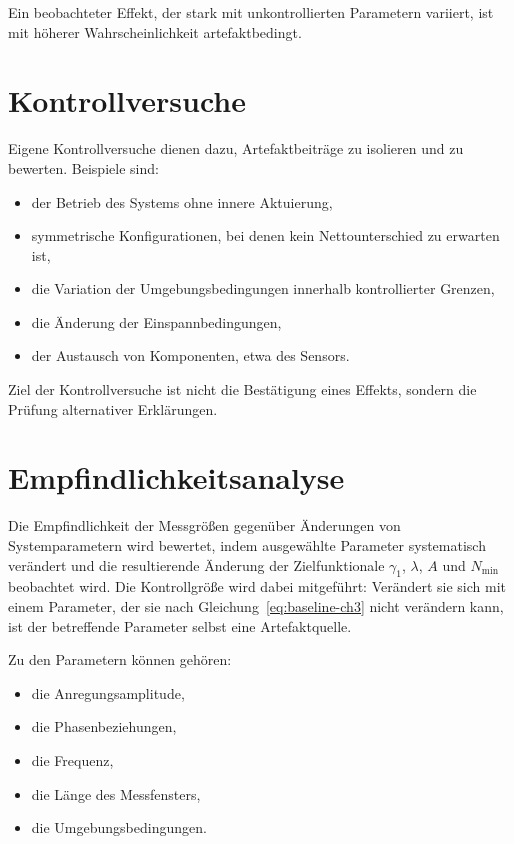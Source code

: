 \documentclass[12pt,a4paper]{report}
\begin{document}
Ein beobachteter Effekt, der stark mit unkontrollierten Parametern
variiert, ist mit höherer Wahrscheinlichkeit artefaktbedingt.

\section{Kontrollversuche}

Eigene Kontrollversuche dienen dazu, Artefaktbeiträge zu isolieren und
zu bewerten. Beispiele sind:

\begin{itemize}
\item der Betrieb des Systems ohne innere Aktuierung,
\item symmetrische Konfigurationen, bei denen kein Nettounterschied zu
      erwarten ist,
\item die Variation der Umgebungsbedingungen innerhalb kontrollierter
      Grenzen,
\item die Änderung der Einspannbedingungen,
\item der Austausch von Komponenten, etwa des Sensors.
\end{itemize}

Ziel der Kontrollversuche ist nicht die Bestätigung eines Effekts,
sondern die Prüfung alternativer Erklärungen.

\section{Empfindlichkeitsanalyse}

Die Empfindlichkeit der Messgrößen gegenüber Änderungen von
Systemparametern wird bewertet, indem ausgewählte Parameter systematisch
verändert und die resultierende Änderung der Zielfunktionale
$\gamma_1$, $\lambda$, $A$ und $N_{\min}$ beobachtet wird. Die
Kontrollgröße wird dabei mitgeführt: Verändert sie sich mit einem
Parameter, der sie nach Gleichung~\eqref{eq:baseline-ch3} nicht
verändern kann, ist der betreffende Parameter selbst eine Artefaktquelle.

Zu den Parametern können gehören:

\begin{itemize}
\item die Anregungsamplitude,
\item die Phasenbeziehungen,
\item die Frequenz,
\item die Länge des Messfensters,
\item die Umgebungsbedingungen.
\end{itemize}
\end{document}
